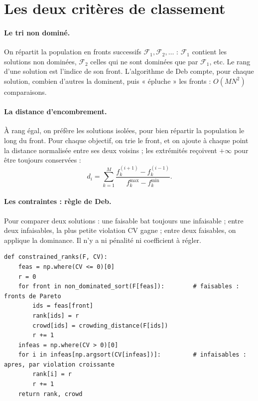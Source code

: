 \section{Les deux critères de classement}
\paragraph{Le tri non dominé.} On répartit la population en fronts successifs $\mathcal F_1,\mathcal F_2,\dots$ : $\mathcal F_1$ contient les solutions non dominées, $\mathcal F_2$ celles qui ne sont dominées que par $\mathcal F_1$, etc. Le rang d'une solution est l'indice de son front. L'algorithme de Deb compte, pour chaque solution, combien d'autres la dominent, puis « épluche » les fronts : $O(MN^2)$ comparaisons.

\paragraph{La distance d'encombrement.} À rang égal, on préfère les solutions isolées, pour bien répartir la population le long du front. Pour chaque objectif, on trie le front, et on ajoute à chaque point la distance normalisée entre ses deux voisins ; les extrémités reçoivent $+\infty$ pour être toujours conservées :
\[
d_i=\sum_{k=1}^{M}\frac{f_k^{(i+1)}-f_k^{(i-1)}}{f_k^{\max}-f_k^{\min}}.
\]

\paragraph{Les contraintes : règle de Deb.} Pour comparer deux solutions : une faisable bat toujours une infaisable ; entre deux infaisables, la plus petite violation $\mathrm{CV}$ gagne ; entre deux faisables, on applique la dominance. Il n'y a ni pénalité ni coefficient à régler.

\begin{codebox}
\begin{lstlisting}
def constrained_ranks(F, CV):
    feas = np.where(CV <= 0)[0]
    r = 0
    for front in non_dominated_sort(F[feas]):        # faisables : fronts de Pareto
        ids = feas[front]
        rank[ids] = r
        crowd[ids] = crowding_distance(F[ids])
        r += 1
    infeas = np.where(CV > 0)[0]
    for i in infeas[np.argsort(CV[infeas])]:         # infaisables : apres, par violation croissante
        rank[i] = r
        r += 1
    return rank, crowd
\end{lstlisting}
\end{codebox}

